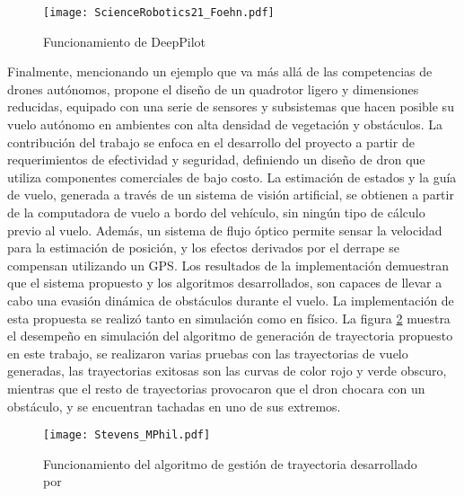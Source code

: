 \begin{figure}[ht]
    \centering
    \texttt{[image: ScienceRobotics21\_Foehn.pdf]}
    \caption{Funcionamiento de DeepPilot\citet{foehn2021time}}
    \label{fig:Foehn}
\end{figure}

Finalmente, mencionando un ejemplo que va más allá de las competencias de drones autónomos, \citet{stevens2021autonomous} propone el diseño de un quadrotor ligero y dimensiones reducidas, equipado con una serie de sensores y subsistemas que hacen posible su vuelo autónomo en ambientes con alta densidad de vegetación y obstáculos.  La contribución del trabajo se enfoca en el desarrollo del proyecto a partir de requerimientos de efectividad y seguridad, definiendo un diseño de dron que utiliza componentes comerciales de bajo costo. La estimación de estados y la guía de vuelo, generada a través de un sistema de visión artificial, se obtienen a partir de la computadora de vuelo a bordo del vehículo, sin ningún tipo de cálculo previo al vuelo. Además, un sistema de flujo óptico permite sensar la velocidad para la estimación de posición, y los efectos derivados por el derrape se compensan utilizando un GPS.
Los resultados de la implementación demuestran que el sistema propuesto y los algoritmos desarrollados, son capaces de llevar a cabo una evasión dinámica de obstáculos durante el vuelo. La implementación de esta propuesta se realizó tanto en simulación como en físico. La figura \ref{fig:Stevens} muestra el desempeño en simulación del algoritmo de generación de trayectoria propuesto en este trabajo, se realizaron varias pruebas con las trayectorias de vuelo generadas, las trayectorias exitosas son las curvas de color rojo y verde obscuro, mientras que el resto de trayectorias provocaron que el dron chocara con un obstáculo, y se encuentran tachadas en uno de sus extremos.


\begin{figure}[ht]
    \centering
    \texttt{[image: Stevens\_MPhil.pdf]}
    \caption{Funcionamiento del algoritmo de gestión de trayectoria desarrollado por \citet{stevens2021autonomous}}
    \label{fig:Stevens}
\end{figure}


